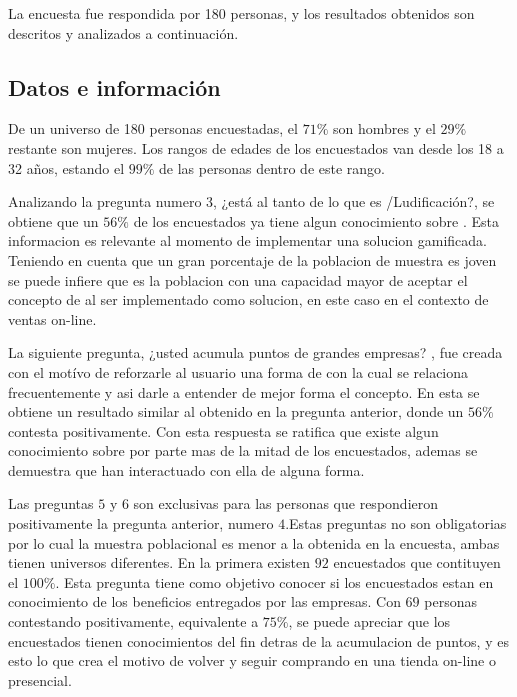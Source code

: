 La encuesta fue respondida por 180 personas, y los resultados obtenidos son descritos y
analizados a continuación.

\subsection{Datos e información}

De un universo de 180 personas encuestadas, el $71\%$ son hombres y el $29\%$ restante son mujeres.
Los rangos de edades de los encuestados van desde los 18 a 32 años, estando el $99\%$ de las personas
dentro de este rango.

Analizando la pregunta numero 3, ¿está al tanto de lo que es {\GAM}/Ludificación?, se obtiene que
 un $56\%$ de los encuestados ya tiene algun conocimiento  sobre {\GAM}. Esta informacion es relevante
al momento de implementar una solucion gamificada. Teniendo en cuenta que un gran porcentaje de la
poblacion de muestra es joven se puede infiere que es la poblacion con una capacidad mayor de aceptar
el concepto de {\GAM} al ser implementado como solucion, en este caso en el contexto de ventas on-line.


La siguiente pregunta, ¿usted acumula puntos de grandes empresas? , fue creada con el motívo de 
reforzarle al usuario una forma de {\GAM} con la cual se relaciona frecuentemente y asi darle
a entender de mejor forma el concepto. En esta se obtiene un resultado similar al obtenido en 
la pregunta anterior, donde un $56\%$ contesta positivamente. Con esta respuesta se ratifica que existe
algun conocimiento sobre {\GAM} por parte mas de la mitad de los encuestados, ademas se demuestra que
han interactuado con ella de alguna forma.


Las preguntas $5$ y $6$ son exclusivas para las personas que respondieron positivamente la
pregunta anterior, numero $4$.Estas preguntas no son obligatorias por lo cual la muestra poblacional
es menor a la obtenida en la encuesta, ambas tienen universos diferentes.
En la primera existen $92$ encuestados que contituyen el $100\%$. Esta pregunta tiene como objetivo 
conocer si los encuestados estan en conocimiento de los beneficios entregados por las empresas.  
Con $69$ personas contestando positivamente, equivalente a $75\%$, se puede apreciar que los 
encuestados tienen conocimientos del fin detras de la acumulacion de puntos, y es esto lo que
crea el motivo de volver y seguir comprando en una tienda on-line o presencial.

